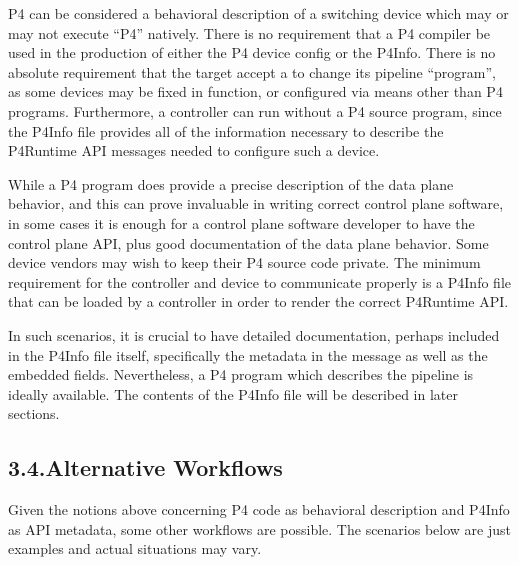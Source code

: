 \documentclass[11pt]{article}
\begin{document}
{%
\noindent{}P4 can be considered a behavioral description of a switching device which may or
may not execute \textquotedblleft{}P4\textquotedblright{} natively. There is no requirement that a P4 compiler be
used in the production of either the P4 device config or the P4Info. There is no
absolute requirement that the target accept a  to
change its pipeline \textquotedblleft{}program\textquotedblright{}, as some devices may be fixed in function, or
configured via means other than P4 programs. Furthermore, a controller can run
without a P4 source program, since the P4Info file provides all of the
information necessary to describe the P4Runtime API messages needed to configure
such a device.%

While a P4 program does provide a precise description of the data plane
behavior, and this can prove invaluable in writing correct control plane
software, in some cases it is enough for a control plane software developer to
have the control plane API, plus good documentation of the data plane
behavior. Some device vendors may wish to keep their P4 source code private. The
minimum requirement for the controller and device to communicate properly is a
P4Info file that can be loaded by a controller in order to render the correct
P4Runtime API.%

In such scenarios, it is crucial to have detailed documentation, perhaps
included in the P4Info file itself, specifically the metadata in the 
message as well as the embedded  fields. Nevertheless, a P4 program which
describes the pipeline is ideally available. The contents of the P4Info file
will be described in later sections.%

\subsection{3.4.\hspace*{0.5em}Alternative Workflows}\label{sec-alternative-workflows}%

\noindent{}Given the notions above concerning P4 code as behavioral description and P4Info
as API metadata, some other workflows are possible. The scenarios below are just
examples and actual situations may vary.%

}
\end{document}
